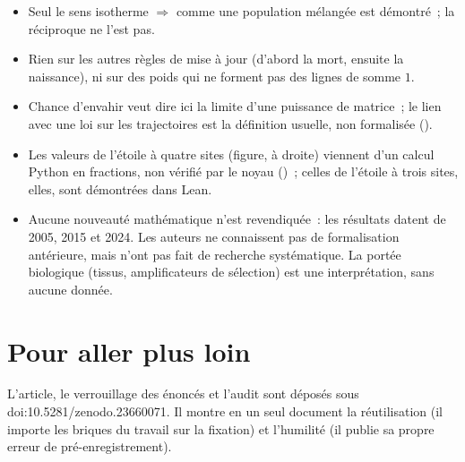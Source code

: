 \begin{limite}
\begin{itemize}
\item Seul le sens \og isotherme $\Rightarrow$ comme une population mélangée\fg{} est démontré~; la réciproque ne
  l'est pas.
\item Rien sur les autres règles de mise à jour (d'abord la mort, ensuite la naissance), ni sur des poids qui ne
  forment pas des lignes de somme $1$.
\item \og Chance d'envahir\fg{} veut dire ici la limite d'une puissance de matrice~; le lien avec une loi sur les
  trajectoires est la définition usuelle, non formalisée ().
\item Les valeurs de l'étoile à quatre sites (figure, à droite) viennent d'un calcul Python en fractions, non
  vérifié par le noyau ()~; celles de l'étoile à trois sites, elles, sont démontrées dans Lean.
\item Aucune nouveauté mathématique n'est revendiquée~: les résultats datent de 2005, 2015 et 2024. Les auteurs ne
  connaissent pas de formalisation antérieure, mais n'ont pas fait de recherche systématique. La portée biologique
  (tissus, amplificateurs de sélection) est une interprétation, sans aucune donnée.
\end{itemize}
\end{limite}

\section*{Pour aller plus loin}

L'article, le verrouillage des énoncés et l'audit sont déposés sous doi:10.5281/\allowbreak zenodo.23660071. Il montre en un
seul document la réutilisation (il importe les briques du travail sur la fixation) et l'humilité (il publie sa propre
erreur de pré-enregistrement).
